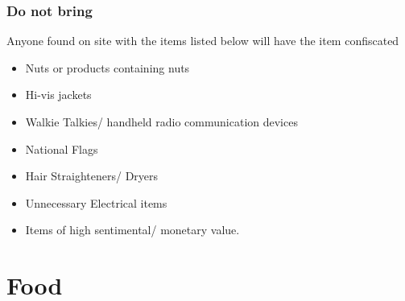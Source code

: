 \documentclass[a4paper, 11pt]{report}
\begin{document}
\subsection{Do not bring}
Anyone found on site with the items listed below will have the item confiscated
\begin{itemize}
    \item Nuts or products containing nuts
    \item Hi-vis jackets
    \item Walkie Talkies/ handheld radio communication devices
    \item National Flags
    \item Hair Straighteners/ Dryers
    \item Unnecessary Electrical items
    \item Items of high sentimental/ monetary value.
\end{itemize}

\chapter{Food}
\end{document}
